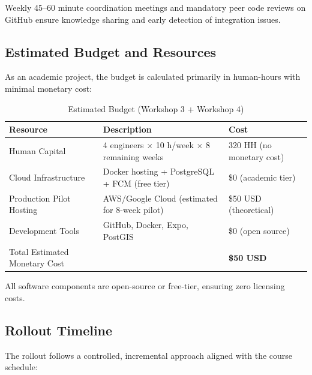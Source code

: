 \documentclass[9pt,conference]{IEEEtran}
\begin{document}
Weekly 45–60 minute coordination meetings and mandatory peer code reviews on GitHub ensure knowledge sharing and early detection of integration issues.

\subsection{Estimated Budget and Resources}

As an academic project, the budget is calculated primarily in human-hours with minimal monetary cost:

\begin{table}[h]
\centering
\small
\caption{Estimated Budget (Workshop 3 + Workshop 4)}
\label{tab:budget}
\begin{tabular}{@{}p{2.5cm}p{3.0cm}p{2.5cm}@{}}
\toprule
\textbf{Resource} & \textbf{Description} & \textbf{Cost} \\
\midrule
Human Capital & 4 engineers $\times$ 10 h/week $\times$ 8 remaining weeks & 320 HH (no monetary cost) \\
Cloud Infrastructure & Docker hosting + PostgreSQL + FCM (free tier) & \$0 (academic tier) \\
Production Pilot Hosting & AWS/Google Cloud (estimated for 8-week pilot) & \$50 USD (theoretical) \\
Development Tools & GitHub, Docker, Expo, PostGIS & \$0 (open source) \\
Total Estimated Monetary Cost & & \textbf{\$50 USD} \\
\bottomrule
\end{tabular}
\end{table}

All software components are open-source or free-tier, ensuring zero licensing costs.

\subsection{Rollout Timeline}

The rollout follows a controlled, incremental approach aligned with the course schedule:
\end{document}

